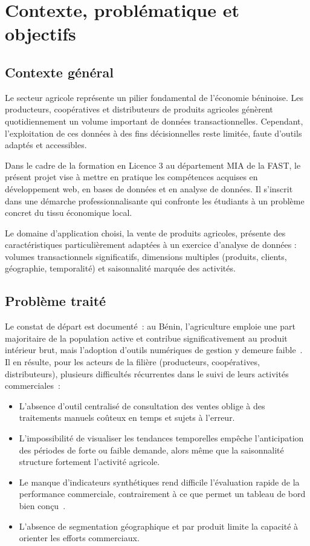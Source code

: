 \documentclass[11pt,a4paper]{report}
\begin{document}
\chapter{Contexte, problématique et objectifs}

\section{Contexte général}
Le secteur agricole représente un pilier fondamental de l'économie béninoise.
Les producteurs, coopératives et distributeurs de produits agricoles génèrent
quotidiennement un volume important de données transactionnelles. Cependant,
l'exploitation de ces données à des fins décisionnelles reste limitée, faute
d'outils adaptés et accessibles.

Dans le cadre de la formation en Licence 3 au département MIA de la FAST, le
présent projet vise à mettre en pratique les compétences acquises en
développement web, en bases de données et en analyse de données. Il s'inscrit
dans une démarche professionnalisante qui confronte les étudiants à un problème
concret du tissu économique local.

Le domaine d'application choisi, la vente de produits agricoles, présente des
caractéristiques particulièrement adaptées à un exercice d'analyse de données :
volumes transactionnels significatifs, dimensions multiples (produits, clients,
géographie, temporalité) et saisonnalité marquée des activités.

\section{Problème traité}
Le constat de départ est documenté~: au Bénin, l'agriculture emploie une part
majoritaire de la population active et contribue significativement au produit
intérieur brut, mais l'adoption d'outils numériques de gestion y demeure
faible~\cite{fao2021digital,worldbank2020}. Il en résulte, pour les acteurs de
la filière (producteurs, coopératives, distributeurs), plusieurs difficultés
récurrentes dans le suivi de leurs activités commerciales~:
\begin{itemize}
  \item L'absence d'outil centralisé de consultation des ventes oblige à des
        traitements manuels coûteux en temps et sujets à l'erreur.
  \item L'impossibilité de visualiser les tendances temporelles empêche
        l'anticipation des périodes de forte ou faible demande, alors même que
        la saisonnalité structure fortement l'activité agricole.
  \item Le manque d'indicateurs synthétiques rend difficile l'évaluation rapide
        de la performance commerciale, contrairement à ce que permet un tableau
        de bord bien conçu~\cite{few2006dashboard}.
  \item L'absence de segmentation géographique et par produit limite la capacité
        à orienter les efforts commerciaux.
\end{itemize}
\end{document}
